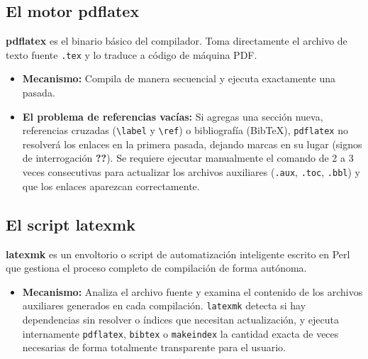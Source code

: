 \documentclass[
10pt, %
a4paper, %
oneside, %
headinclude,footinclude, %
BCOR5mm, %
]{scrartcl}
\begin{document}
\subsection{El motor pdflatex}
\textbf{pdflatex} es el binario básico del compilador. Toma directamente el archivo de texto fuente \texttt{.tex} y lo traduce a código de máquina PDF.
\begin{itemize}
	\item \textbf{Mecanismo:} Compila de manera secuencial y ejecuta exactamente una pasada. 
	\item \textbf{El problema de referencias vacías:} Si agregas una sección nueva, referencias cruzadas (\texttt{\textbackslash label} y \texttt{\textbackslash ref}) o bibliografía (BibTeX), \texttt{pdflatex} no resolverá los enlaces en la primera pasada, dejando marcas en su lugar (signos de interrogación \textbf{??}). Se requiere ejecutar manualmente el comando de 2 a 3 veces consecutivas para actualizar los archivos auxiliares (\texttt{.aux}, \texttt{.toc}, \texttt{.bbl}) y que los enlaces aparezcan correctamente.
\end{itemize}

\subsection{El script latexmk}
\textbf{latexmk} es un envoltorio o script de automatización inteligente escrito en Perl que gestiona el proceso completo de compilación de forma autónoma.
\begin{itemize}
	\item \textbf{Mecanismo:} Analiza el archivo fuente y examina el contenido de los archivos auxiliares generados en cada compilación. \texttt{latexmk} detecta si hay dependencias sin resolver o índices que necesitan actualización, y ejecuta internamente \texttt{pdflatex}, \texttt{bibtex} o \texttt{makeindex} la cantidad exacta de veces necesarias de forma totalmente transparente para el usuario.
\end{itemize}
\end{document}
